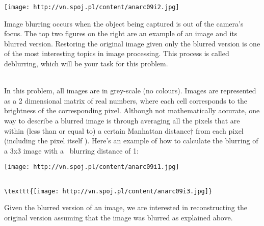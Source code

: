 \texttt{[image: http://vn.spoj.pl/content/anarc09i2.jpg]}

   Image blurring occurs when the object being captured is out of the camera’s focus. The top two figures on the right are an example of an image and its blurred version. Restoring the original image given only the blurred version is one of the most interesting topics in image processing. This process is called deblurring, which will be your task for this problem.  


\\   In this problem, all images are in grey-scale (no colours). Images are represented as a 2 dimensional matrix of real numbers, where each cell corresponds to the  brightness of the corresponding pixel. Although not mathematically accurate, one way to describe a blurred image is through averaging all the pixels that are within (less than or equal to) a certain Manhattan distance† from each pixel (including the pixel itself ). Here’s an example of how to calculate the blurring of a 3x3 image with a  blurring distance of 1:  


\texttt{[image: http://vn.spoj.pl/content/anarc09i1.jpg]}
\begin{verbatim}

\texttt{[image: http://vn.spoj.pl/content/anarc09i3.jpg]}\end{verbatim}

   Given the blurred version of an image, we are interested in reconstructing the original version assuming that the image was blurred as explained above.
